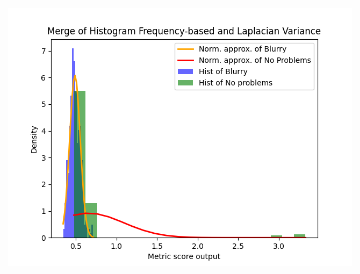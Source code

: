 \begin{figure}[H]
\begin{subfigure}[t]{0.48\textwidth}
        \caption{}
        \label{fig:HF_LV_thresh}
    \end{subfigure}\hspace{1em}
    \begin{subfigure}[t]{0.48\textwidth}
        \includegraphics[width=\textwidth]{Figures/results_on_thresholds/output_dens_hf_lv.png}
        \caption{}
        \label{fig:HF_LV_dens}
    \end{subfigure}\hspace{1em}
    \caption{}
    \label{fig:HF_LV_final}
\end{figure}

